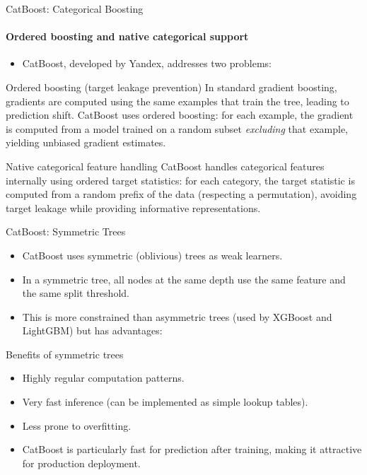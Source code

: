 \begin{frame}{CatBoost: Categorical Boosting}
  \framesubtitle{Ordered boosting and native categorical support}
  \begin{itemize}
    \item \alert{CatBoost}, developed by Yandex, addresses two problems:
  \end{itemize}
  \begin{block}{Ordered boosting (target leakage prevention)}
    In standard gradient boosting, gradients are computed using the same examples that train
    the tree, leading to \alert{prediction shift}. CatBoost uses ordered boosting: for each
    example, the gradient is computed from a model trained on a random subset \emph{excluding}
    that example, yielding unbiased gradient estimates.
  \end{block}
  \begin{block}{Native categorical feature handling}
    CatBoost handles categorical features internally using ordered target statistics: for each
    category, the target statistic is computed from a random prefix of the data (respecting a
    permutation), avoiding target leakage while providing informative representations.
  \end{block}
\end{frame}

\begin{frame}{CatBoost: Symmetric Trees}
  \begin{itemize}
    \item CatBoost uses \alert{symmetric (oblivious) trees} as weak learners.
    \item In a symmetric tree, all nodes at the same depth use the \alert{same feature and
          the same split threshold}.
    \item This is more constrained than asymmetric trees (used by XGBoost and LightGBM) but
          has advantages:
  \end{itemize}
  \begin{block}{Benefits of symmetric trees}
    \begin{itemize}
      \item Highly regular computation patterns.
      \item Very fast inference (can be implemented as simple lookup tables).
      \item Less prone to overfitting.
    \end{itemize}
  \end{block}
  \begin{itemize}
    \item CatBoost is particularly fast for \alert{prediction after training}, making it
          attractive for production deployment.
  \end{itemize}
\end{frame}

